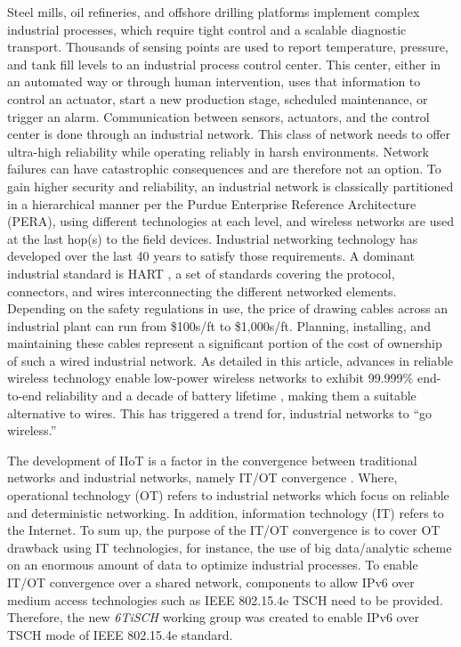 Steel mills, oil refineries, and offshore drilling platforms implement complex industrial processes, which require tight control and a scalable diagnostic transport. Thousands of sensing points are used to report temperature, pressure, and tank fill levels to an industrial process control center. This center, either in an automated way or through human intervention, uses that information to control an actuator, start a new production stage, scheduled maintenance, or trigger an alarm. Communication between sensors, actuators, and the control center is done through an industrial network. This class of network needs to offer ultra-high reliability while operating reliably in harsh environments. Network failures can have catastrophic consequences and are therefore not an option. To gain higher security and reliability, an industrial network is classically partitioned in a hierarchical manner per the Purdue Enterprise Reference Architecture (PERA), using different technologies at each level, and wireless networks are used at the last hop(s) to the field devices. Industrial networking technology has developed over the last 40 years to satisfy those requirements. A dominant industrial standard is HART \cite{6728782}, a set of standards covering the protocol, connectors, and wires interconnecting the different networked elements. Depending on the safety regulations in use, the price of drawing cables across an industrial plant can run from \$100s/ft to \$1,000s/ft. Planning, installing, and maintaining these cables represent a significant portion of the cost of ownership of such a wired industrial network. As detailed in this article, advances in reliable wireless technology enable low-power wireless networks to exhibit 99.999\% end-to-end reliability and a decade of battery lifetime \cite{6248647}, making them a suitable alternative to wires. This has triggered a trend for, industrial networks to “go wireless.”


The development of IIoT is a factor in the convergence between traditional networks and industrial networks, namely IT/OT convergence \cite{6979984, long}. Where, operational technology (OT) refers to industrial networks which focus on reliable and deterministic networking. In addition, information technology (IT) refers to the Internet. To sum up, the purpose of the IT/OT convergence is to cover OT drawback using IT technologies, for instance, the use of big data/analytic scheme on an enormous amount of data to optimize industrial processes. To enable IT/OT convergence over a shared network, components to allow IPv6 over medium access technologies such as IEEE 802.15.4e TSCH need to be provided. Therefore, the new \textit{6TiSCH}  working group was created to enable IPv6 over TSCH mode of IEEE 802.15.4e standard. 

